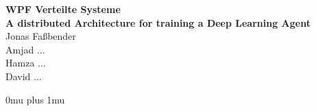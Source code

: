 \documentclass[12pt, twoside]{article}
\begin{document}
\begin{titlepage}
	\begin{center}
		{\Huge{\textbf{WPF Verteilte Systeme}}} \\
	\vspace{3cm}
		{\Huge{\textbf{A distributed Architecture for training
      a Deep Learning Agent}}} \\
	\vspace{2cm}
		\huge{Jonas Fa{\ss}bender} \\
	\vspace{.5cm}
		\huge{Amjad ...} \\
	\vspace{.5cm}
		\huge{Hamza ...} \\
	\vspace{.5cm}
		\huge{David ...}
	\end{center}
%
%
%
%
%
%
%
%
%
%
%
%
%
%
%
%
%
\end{titlepage}

\tableofcontents
\newpage
\listoffigures





\Urlmuskip 0mu plus 1mu\relax

\end{document}

